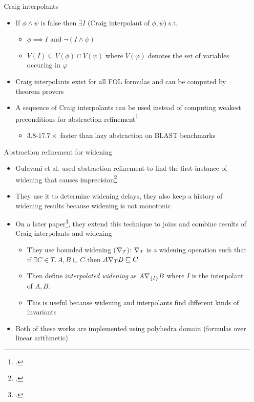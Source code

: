 \documentclass[aspectratio=169]{beamer}
\begin{document}
\begin{frame}{Craig interpolants}
  \begin{itemize}[<+->]
  \item If $\phi \wedge \psi$ is false then $\exists I$ (Craig interpolant of $\phi, \psi$) s.t.
    \begin{itemize}[<+->]
    \item $\phi \implies I$ and $\neg (I \wedge \psi)$
    \item $V(I) \subseteq V(\phi) \cap V(\psi)$ where $V(\varphi)$ denotes the set of variables occuring in $\varphi$
    \end{itemize}
  \item Craig interpolants exist for all FOL formulas and can be computed by theorem provers
  \item A sequence of Craig interpolants can be used instead of computing weakest preconditions for abstraction refinement\footcite{mcmillan2006lazy}\pause
    \begin{itemize}
    \item $3.8$-$17.7\times$ faster than lazy abstraction on BLAST benchmarks
    \end{itemize}
  \end{itemize}
\end{frame}

\begin{frame}{Abstraction refinement for widening}
  \small
  \begin{itemize}[<+->]
  \item Gulavani et al. used abstraction refinement to find the first instance of widening that causes imprecision\footcite{gulavani2006counterexample}
  \item They use it to determine widening delays, they also keep a history of widening results because widening is not monotonic
  \item On a later paper\footcite{gulavani2008automatically}, they extend this technique to joins and combine results of Craig interpolants and widening
    \begin{itemize}\footnotesize
    \item They use bounded widening ($\nabla_T$): $\nabla_T$ is a widening operation such that\\ if $\exists C \in T.\, A, B \sqsubseteq C$ then $A \nabla_T B \sqsubseteq C$
    \item Then define \emph{interpolated widening} as $A \nabla_{\left\{I\right\}} B$ where $I$ is the interpolant of $A, B$.
    \item This is useful because widening and interpolants find different kinds of invariants
    \end{itemize}
  \item Both of these works are implemented using polyhedra domain (formulas over linear arithmetic)
  \end{itemize}
\end{frame}
\end{document}
